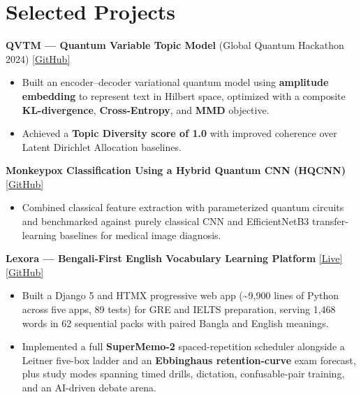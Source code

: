 \documentclass[a4paper,10pt]{article}
\begin{document}
\section*{Selected Projects}

\textbf{QVTM --- Quantum Variable Topic Model} (Global Quantum Hackathon 2024)
\hfill
\href{https://github.com/saifibnaezhararko/QVTM}{[GitHub]}

\begin{itemize}
    \item Built an encoder--decoder variational quantum model using \textbf{amplitude embedding} to represent text in Hilbert space, optimized with a composite \textbf{KL-divergence}, \textbf{Cross-Entropy}, and \textbf{MMD} objective.

    \item Achieved a \textbf{Topic Diversity score of 1.0} with improved coherence over Latent Dirichlet Allocation baselines.
\end{itemize}

\textbf{Monkeypox Classification Using a Hybrid Quantum CNN (HQCNN)}
\hfill
\href{https://tinyurl.com/3kvmhea8}{[GitHub]}

\begin{itemize}
    \item Combined classical feature extraction with parameterized quantum circuits and benchmarked against purely classical CNN and EfficientNetB3 transfer-learning baselines for medical image diagnosis.
\end{itemize}

\textbf{Lexora --- Bengali-First English Vocabulary Learning Platform}
\hfill
\href{https://lexora-sipb.onrender.com/}{[Live]}
\href{https://github.com/saifibnaezhararko/Lexora-English-Vocabulary-Learning-App-Django}{[GitHub]}

\begin{itemize}
    \item Built a Django 5 and HTMX progressive web app (\textasciitilde 9,900 lines of Python across five apps, 89 tests) for GRE and IELTS preparation, serving 1{,}468 words in 62 sequential packs with paired Bangla and English meanings.

    \item Implemented a full \textbf{SuperMemo-2} spaced-repetition scheduler alongside a Leitner five-box ladder and an \textbf{Ebbinghaus retention-curve} exam forecast, plus study modes spanning timed drills, dictation, confusable-pair training, and an AI-driven debate arena.
\end{itemize}
\end{document}
